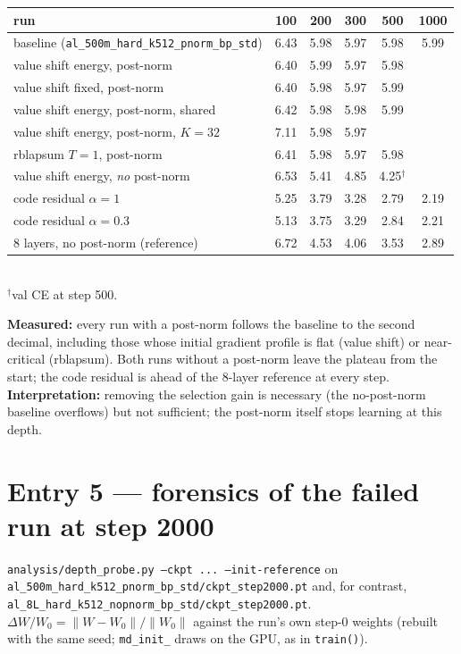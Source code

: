 \documentclass[11pt,a4paper]{article}
\newcommand{\code}[1]{\texttt{#1}}
\begin{document}
\begin{center}\small
\begin{tabular}{lccccc}
\toprule
run & 100 & 200 & 300 & 500 & 1000 \\
\midrule
baseline (\code{al\_500m\_hard\_k512\_pnorm\_bp\_std}) & 6.43 & 5.98 & 5.97 & 5.98 & 5.99 \\
value shift energy, post-norm & 6.40 & 5.99 & 5.97 & 5.98 & \\
value shift fixed, post-norm & 6.40 & 5.98 & 5.97 & 5.99 & \\
value shift energy, post-norm, shared & 6.42 & 5.98 & 5.98 & 5.99 & \\
value shift energy, post-norm, \(K=32\) & 7.11 & 5.98 & 5.97 & & \\
rblapsum \(T=1\), post-norm & 6.41 & 5.98 & 5.97 & 5.98 & \\
value shift energy, \emph{no} post-norm & 6.53 & 5.41 & 4.85 & 4.25$^\dagger$ & \\
code residual \(\alpha=1\) & 5.25 & 3.79 & 3.28 & 2.79 & 2.19 \\
code residual \(\alpha=0.3\) & 5.13 & 3.75 & 3.29 & 2.84 & 2.21 \\
8 layers, no post-norm (reference) & 6.72 & 4.53 & 4.06 & 3.53 & 2.89 \\
\bottomrule
\end{tabular}\\[2pt]
\footnotesize$^\dagger$val CE at step 500.
\end{center}

\textbf{Measured:} every run with a post-norm follows the baseline to the second
decimal, including those whose initial gradient profile is flat (value shift)
or near-critical (rblapsum).  Both runs without a post-norm leave the plateau
from the start; the code residual is ahead of the 8-layer reference at every
step.  \textbf{Interpretation:} removing the selection gain is necessary (the
no-post-norm baseline overflows) but not sufficient; the post-norm itself stops
learning at this depth.

\section{Entry 5 --- forensics of the failed run at step 2000}

\code{analysis/depth\_probe.py --ckpt ... --init-reference} on
\code{al\_500m\_hard\_k512\_pnorm\_bp\_std/ckpt\_step2000.pt} and, for
contrast, \code{al\_8L\_hard\_k512\_nopnorm\_bp\_std/ckpt\_step2000.pt}.
\(\Delta W/W_0=\|W-W_0\|/\|W_0\|\) against the run's own step-0 weights
(rebuilt with the same seed; \code{md\_init\_} draws on the GPU, as in
\code{train()}).
\end{document}
